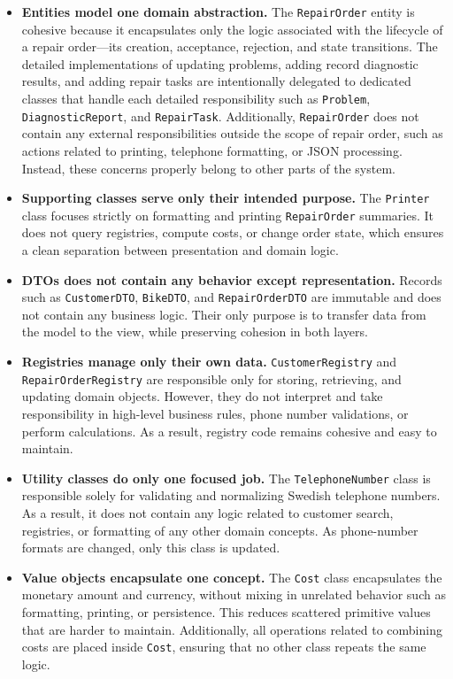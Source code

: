 \documentclass[a4paper]{scrartcl}
\begin{document}
\begin{itemize}
  \item \textbf{Entities model one domain abstraction.}  
        The \texttt{RepairOrder} entity is cohesive because it encapsulates only the logic associated with the lifecycle of a repair order—its creation, acceptance, rejection, and state transitions. The detailed implementations of updating problems, adding record diagnostic results, and adding repair tasks are intentionally delegated to dedicated classes that handle each detailed responsibility such as \texttt{Problem}, \texttt{DiagnosticReport}, and \texttt{RepairTask}. Additionally, \texttt{RepairOrder} does not contain any external responsibilities outside the scope of repair order, such as actions related to printing, telephone formatting, or JSON processing. Instead, these concerns properly belong to other parts of the system.

  \item \textbf{Supporting classes serve only their intended purpose.}  
        The \texttt{Printer} class focuses strictly on formatting and printing \texttt{RepairOrder} summaries. It does not query registries, compute costs, or change order state, which ensures a clean separation between presentation and domain logic.

  \item \textbf{DTOs does not contain any behavior except representation.}  
        Records such as \texttt{CustomerDTO}, \texttt{BikeDTO}, and \texttt{RepairOrderDTO} are immutable and does not contain any business logic. Their only purpose is to transfer data from the model to the view, while preserving cohesion in both layers.

  \item \textbf{Registries manage only their own data.}  
        \texttt{CustomerRegistry} and \texttt{RepairOrderRegistry} are responsible only for storing, retrieving, and updating domain objects. However, they do not interpret and take responsibility in high-level business rules, phone number validations, or perform calculations. As a result, registry code remains cohesive and easy to maintain.

  \item \textbf{Utility classes do only one focused job.}  
        The \texttt{TelephoneNumber} class is responsible solely for validating and normalizing Swedish telephone numbers. As a result, it does not contain any logic related to customer search, registries, or formatting of any other domain concepts. As phone-number formats are changed, only this class is updated.

  \item \textbf{Value objects encapsulate one concept.}  
        The \texttt{Cost} class encapsulates the monetary amount and currency, without mixing in unrelated behavior such as formatting, printing, or persistence. This reduces scattered primitive values that are harder to maintain. Additionally, all operations related to combining costs are placed inside \texttt{Cost}, ensuring that no other class repeats the same logic.
\end{itemize}
\end{document}

